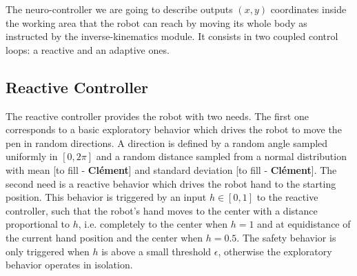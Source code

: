 \documentclass[letterpaper, 10 pt, conference]{ieeeconf}  %
\newcommand\cmf[1]{{\footnotesize \color{red}[#1 - \textbf{Cl\'ement}]}} %
\begin{document}
 
The neuro-controller we are going to describe outputs $(x, y)$ coordinates inside the working area that the robot can reach by moving its whole body as instructed by the inverse-kinematics module. It consists in two coupled control loops: a reactive and an adaptive ones.

\subsection{Reactive Controller}

The reactive controller provides the robot with two needs. The first one corresponds to a basic exploratory behavior which drives the robot to move the pen in random directions. A direction is defined by a random angle sampled uniformly in $[0, 2\pi]$ and a random distance  sampled from a normal distribution with mean \cmf{to fill} and standard deviation \cmf{to fill}. The second need is a reactive behavior which drives the robot hand to the starting position. This behavior is triggered by an input $h \in [0,1]$ to the reactive controller, such that the robot's hand moves to the center with a distance proportional to $h$, i.e. completely to the center when $h=1$ and at equidistance of the current hand position and the center when $h=0.5$. The safety behavior is only triggered when $h$ is above a small threshold $\epsilon$, otherwise the exploratory behavior operates in isolation. 
\end{document}
